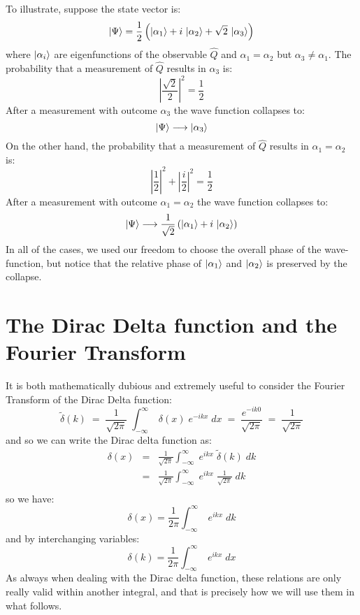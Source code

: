 \documentclass[12pt]{book}
\begin{document}
To illustrate, suppose the state vector is: 
$$\ket{\Psi} = \frac{1}{2}\left(\ket{\alpha_1} + i\,\ket{\alpha_2} + \sqrt{2}\,\ket{\alpha_3}\right)$$
where $\ket{\alpha_i}$ are eigenfunctions of the observable $\hat{Q}$ and $\alpha_1 = \alpha_2$ but $\alpha_3 \neq \alpha_1$.
The probability that a measurement of $\hat{Q}$ results in $\alpha_3$ is:
$$\left|\frac{\sqrt{2}}{2}\right|^2 = \frac{1}{2}$$
After a measurement with outcome $\alpha_3$ the wave function collapses to:
$$\ket{\Psi} \longrightarrow \ket{\alpha_3}$$
On the other hand, the probability that a measurement of $\hat{Q}$ results in $\alpha_1 = \alpha_2$ is:
$$\left|\frac{1}{2}\right|^2 + \left|\frac{i}{2}\right|^2 = \frac{1}{2}$$
After a measurement with outcome $\alpha_1=\alpha_2$ the wave function collapses to:
$$\ket{\Psi} \longrightarrow \frac{1}{\sqrt{2}}\left(\ket{\alpha_1} + i\,\ket{\alpha_2}\right)$$
In all of the cases, we used our freedom to choose the overall phase of the wave-function, but notice that the relative phase of $\ket{\alpha_1}$ and $\ket{\alpha_2}$ is preserved by the collapse.

\section{The Dirac Delta function and the Fourier Transform}

It is both mathematically dubious and extremely useful to consider the Fourier Transform of the Dirac Delta function:
$$
\widetilde{\delta}(k) \; = \; \frac{1}{\sqrt{2\pi}} \; \int_{-\infty}^{\infty} \; \delta(x) \; e^{-ikx} \; dx  \; = \; \frac{e^{-ik0}}{\sqrt{2\pi}} \; = \; \frac{1}{\sqrt{2\pi}} 
$$
and so we can write the Dirac delta function as:
\begin{eqnarray*}
\delta(x) &=& \frac{1}{\sqrt{2\pi}} \int_{-\infty}^{\infty} \; e^{ikx} \; \widetilde{\delta}(k) \; dk \\
&=& \frac{1}{\sqrt{2\pi}} \int_{-\infty}^{\infty} \; e^{ikx} \; \frac{1}{\sqrt{2\pi}} \; dk \\
\end{eqnarray*}
so we have:
\begin{equation}
\label{eqn:fourierdelta}
\delta(x) = \frac{1}{2\pi} \int_{-\infty}^{\infty} \; e^{ikx} \; dk
\end{equation}
and by interchanging variables:
\begin{equation*}
\delta(k) = \frac{1}{2\pi} \int_{-\infty}^{\infty} \; e^{ikx} \; dx
\end{equation*}
As always when dealing with the Dirac delta function, these relations are only really valid within another integral, and that is precisely how we will use them in what follows.
\end{document}
